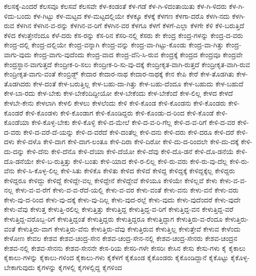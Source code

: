 {ಕೆಲಸಕ್ಕೆ-ಎಂದರೆ
ಕೆಲಸವೂ
ಕೆಲಸವೆ
ಕೆಲಸವೇ
ಕೆಳ-ಕಂಡಂತೆ
ಕೆಳ-ಗಡೆ
ಕೆಳ-ಗಿ-ಳಿದಂತಾಯಿತು
ಕೆಳ-ಗಿ-ಳಿದರು
ಕೆಳ-ಗಿ-ಳಿದು-ಬಂದು
ಕೆಳ-ಗಿಟ್ಟು
ಕೆಳ-ಮಟ್ಟದ
ಕೆಳ-ಮಟ್ಟದಲ್ಲಿಯೇ
ಕೆಳಕ್ಕೂ
ಕೆಳಕ್ಕೆ
ಕೆಳಗಣ
ಕೆಳಗಾ-ದರೊ
ಕೆಳಗಿ-ನದು
ಕೆಳಗಿ-ರುವ
ಕೆಳಗಿನ
ಕೆಳಗಿನ-ವ-ರನ್ನು
ಕೆಳಗಿನ-ವ-ರಿಗೆ
ಕೆಳಗಿನ-ವರ
ಕೆಳಗೂ
ಕೆಳಗೆ
ಕೆಳಗೆ-ಎಲ್ಲಾ
ಕೆಳಗೇ
ಕೆಳಿ
ಕೆಳಿ-ಬರುತ್ತಿದೆ
ಕೆಳಿದ
ಕೆಳುತ್ತೇನೆಂದೂ
ಕೆಳೆ-ದರು
ಕೆಸ-ರನ್ನು
ಕೆಸ-ರಿನ
ಕೆಸರಿ-ನಲ್ಲಿ
ಕೆಸರು
ಕೇ
ಕೇಂದ್ರ
ಕೇಂದ್ರ-ಗಳನ್ನು
ಕೇಂದ್ರ-ದ-ವರು
ಕೇಂದ್ರ-ದಲ್ಲಿ
ಕೇಂದ್ರ-ದಲ್ಲಿಯೇ
ಕೇಂದ್ರ-ವನ್ನಾಗಿ
ಕೇಂದ್ರ-ವನ್ನು
ಕೇಂದ್ರ-ವಾ-ಗಿಟ್ಟು-ಕೊಂಡು
ಕೇಂದ್ರ-ವಾ-ಗಿತ್ತು
ಕೇಂದ್ರ-ವಾಗು-ವುದು
ಕೇಂದ್ರ-ವಾಗು-ವುದೆಂದು
ಕೇಂದ್ರ-ವಾದ
ಕೇಂದ್ರ-ವೆನಿ-ಸಿ-ರುವ
ಕೇಂದ್ರಕ್ಕೆ
ಕೇಂದ್ರದ
ಕೇಂದ್ರವೂ
ಕೇಂದ್ರವೇ
ಕೇಂದ್ರಸ್ಥಾನ-ವಾಗುತ್ತದೆ
ಕೇಂದ್ರೀಕ-ರಿ-ಸಲು
ಕೇಂದ್ರೀಕ-ರಿ-ಸು-ವು-ದಕ್ಕೆ
ಕೇಂದ್ರೀಕೃತ-ವಾಗಿ-ರುತ್ತದೆ
ಕೇಂದ್ರೀಕೃತ-ವಾಗಿ-ರುವ
ಕೇಂದ್ರೀಕೃತ-ವಾಗು-ವಂತೆ
ಕೇಂಬ್ರಿಡ್ಜ್
ಕೇದಾರ
ಕೇದಾರ-ನಾಥ
ಕೇದಾರ-ನಾಥಕ್ಕೆ
ಕೇನ
ಕೇಪಿ
ಕೇರೆ
ಕೇಳ-ತೊಡಗಿತು
ಕೇಳ-ತೊಡಗಿದರು
ಕೇಳ-ದಂತೆ
ಕೇಳ-ಬರುತ್ತಿಲ್ಲ
ಕೇಳ-ಬಹು-ದಾ-ಗಿತ್ತು
ಕೇಳ-ಬಹು-ದೆಂದೂ
ಕೇಳ-ಬಹುದು
ಕೇಳ-ಬಹುದೆ
ಕೇಳ-ಬಾ-ರದು
ಕೇಳ-ಬೇಕು
ಕೇಳ-ಬೇಕೆಂದಿದ್ದೀಯೋ
ಕೇಳ-ಬೇಕೆಂದು
ಕೇಳ-ಬೇಕೆಂದೆ
ಕೇಳ-ಲಿಲ್ಲ
ಕೇಳದ
ಕೇಳದೆ
ಕೇಳಬೇ-ಕೇನು
ಕೇಳಲಾಗಿ
ಕೇಳಲಿ
ಕೇಳಲು
ಕೇಳಲೆಂದು
ಕೇಳಿ
ಕೇಳಿ-ಕೊಂಡ
ಕೇಳಿ-ಕೊಂಡನು
ಕೇಳಿ-ಕೊಂಡರು
ಕೇಳಿ-ಕೊಂಡರೆ
ಕೇಳಿ-ಕೊಂಡಳು
ಕೇಳಿ-ಕೊಂಡಾಗ
ಕೇಳಿ-ಕೊಂಡಿದ್ದರು
ಕೇಳಿ-ಕೊಂಡು-ದ-ರಿಂದ
ಕೇಳಿ-ಕೊಂಡೆ
ಕೇಳಿ-ಕೊಂಡೆಯಾ
ಕೇಳಿ-ಕೊಳ್ಳ-ಬೇಕು
ಕೇಳಿ-ಕೊಳ್ಳಿ
ಕೇಳಿ-ದ-ಮೇಲೆ
ಕೇಳಿ-ದ-ವ-ರಿ-ಗೆಲ್ಲ
ಕೇಳಿ-ದ-ವ-ರಿಗೆ
ಕೇಳಿ-ದ-ವರ
ಕೇಳಿ-ದ-ವರು
ಕೇಳಿ-ದ-ವರೆ-ದೆ-ಯನ್ನು
ಕೇಳಿ-ದ-ವರೆದೆ
ಕೇಳಿ-ದಂತೆಲ್ಲ
ಕೇಳಿ-ದನು
ಕೇಳಿ-ದರು
ಕೇಳಿ-ದರೂ
ಕೇಳಿ-ದರೆ
ಕೇಳಿ-ದಳು
ಕೇಳಿ-ದಳೊ
ಕೇಳಿ-ದಾಗ
ಕೇಳಿ-ದಾಗ-ಲಂತೂ
ಕೇಳಿ-ದಿರಾ
ಕೇಳಿ-ದಿರೋ
ಕೇಳಿ-ದು-ದ-ರಿಂದಲೇ
ಕೇಳಿ-ದು-ದಕ್ಕೆ
ಕೇಳಿ-ದು-ದನ್ನು
ಕೇಳಿ-ದೆನು
ಕೇಳಿ-ದೆನೊ
ಕೇಳಿ-ದೆಯಾ
ಕೇಳಿ-ದೆಯೋ
ಕೇಳಿ-ದೆವು
ಕೇಳಿ-ದೊ-ಡನೆ
ಕೇಳಿ-ದೊ-ಡನೆಯೆ
ಕೇಳಿ-ದೊ-ಡನೆಯೇ
ಕೇಳಿ-ಬ-ರುತ್ತಿತ್ತು
ಕೇಳಿ-ಬಂತು
ಕೇಳಿ-ಯಾದ
ಕೇಳಿ-ರ-ಲಿಲ್ಲ
ಕೇಳಿ-ರು-ವರು
ಕೇಳಿ-ರು-ವು-ದೆಲ್ಲ
ಕೇಳಿ-ರು-ವೆನು
ಕೇಳಿ-ಸಿ-ಕೊಳ್ಳ-ಲಿಲ್ಲ
ಕೇಳಿ-ಸಿತು
ಕೇಳಿಕೊ
ಕೇಳಿತು
ಕೇಳಿದ
ಕೇಳಿದೆ
ಕೇಳಿದ್ದ
ಕೇಳಿದ್ದಕ್ಕೆ
ಕೇಳಿದ್ದಕ್ಕೆಲ್ಲ
ಕೇಳಿದ್ದರು
ಕೇಳಿದ್ದರೂ
ಕೇಳಿದ್ದು
ಕೇಳಿದ್ದೆ
ಕೇಳಿದ್ದೇ-ವಲ್ಲ
ಕೇಳಿದ್ದೇನೆ
ಕೇಳಿದ್ದೇವೆ
ಕೇಳಿಯೂ
ಕೇಳಿಯೇ
ಕೇಳಿಲ್ಲವೆ
ಕೇಳು
ಕೇಳು-ವ-ವ-ನಲ್ಲ
ಕೇಳು-ವ-ವ-ರೆಗೆ
ಕೇಳು-ವ-ವ-ರೆದೆ-ಯಲ್ಲಿ
ಕೇಳು-ವ-ವರ
ಕೇಳು-ವಂತೆ
ಕೇಳು-ವನು
ಕೇಳು-ವನೆ
ಕೇಳು-ವರು
ಕೇಳು-ವು-ದ-ರಿಂದ
ಕೇಳು-ವು-ದಕ್ಕೆ
ಕೇಳು-ವು-ದಿಲ್ಲ
ಕೇಳು-ವುದ-ರಲ್ಲೆ
ಕೇಳು-ವುದು
ಕೇಳು-ವುದೆಂದರೆ
ಕೇಳು-ವುದೇ
ಕೇಳು-ವೆವು
ಕೇಳುತ್ತ
ಕೇಳುತ್ತಿ-ರಲಿಲ್ಲ
ಕೇಳುತ್ತಿತ್ತು
ಕೇಳುತ್ತಿದ್ದ
ಕೇಳುತ್ತಿದ್ದ-ವ-ರಿಗೆ
ಕೇಳುತ್ತಿದ್ದ-ವನ
ಕೇಳುತ್ತಿದ್ದ-ವರೆ
ಕೇಳುತ್ತಿದ್ದ-ವರೊಬ್ಬ-ರಿಗೆ
ಕೇಳುತ್ತಿದ್ದಂತೆ
ಕೇಳುತ್ತಿದ್ದರು
ಕೇಳುತ್ತಿದ್ದರೂ
ಕೇಳುತ್ತಿದ್ದಾಗ
ಕೇಳುತ್ತಿರು-ವ-ರೆಂದೂ
ಕೇಳುತ್ತಿರು-ವಂತೆ
ಕೇಳುತ್ತಿರು-ವಾಗ
ಕೇಳುತ್ತಿರು-ವೆನು
ಕೇಳುತ್ತಿರು-ವೆವು
ಕೇಳುತ್ತಿರುವ
ಕೇಳುತ್ತಿಲ್ಲ
ಕೇಳುತ್ತೇವೆ
ಕೇಳುವ
ಕೇಳೆಂದು
ಕೇಳೋಣ
ಕೇವಲ
ಕೇಶವ
ಕೇಶವ-ಚಂದ್ರ-ಸೇನ
ಕೇಶವ-ಚಂದ್ರ-ಸೇನ-ನಲ್ಲಿ
ಕೇಶವ-ಚಂದ್ರ-ಸೇನರು
ಕೇಶವ-ಚಂದ್ರನ
ಕೇಶವ-ನಲ್ಲಿ
ಕೇಶವ-ಸೇನನು
ಕೇಶವ-ಸೇನನೇ
ಕೇಸ-ರಿಯ
ಕೇಸರಿ-ಗಳೇ
ಕೇಸರಿಃ
ಕೇಸಿನ
ಕೇಸು
ಕೇಸು-ಗಳು
ಕೈ
ಕೈಕಾಲು
ಕೈಕಾಲು-ಗಳನ್ನು
ಕೈಕಾಲು-ಗಳಿಂದ
ಕೈಕಾಲು-ಗಳು
ಕೈಕೆಳಗೆ
ಕೈಕೊಂಡ
ಕೈಕೊಂಡರು
ಕೈಕೊಂಡಿದ್ದಾನೆ
ಕೈಕೊಟ್ಟು
ಕೈಕೊಳ್ಳ-ಬೇಕಾಗುವುದು
ಕೈಗಳನ್ನು
ಕೈಗಳಲ್ಲಿ
ಕೈಗಳಲ್ಲಿದ್ದ
ಕೈಗಳಿಂದ
}
